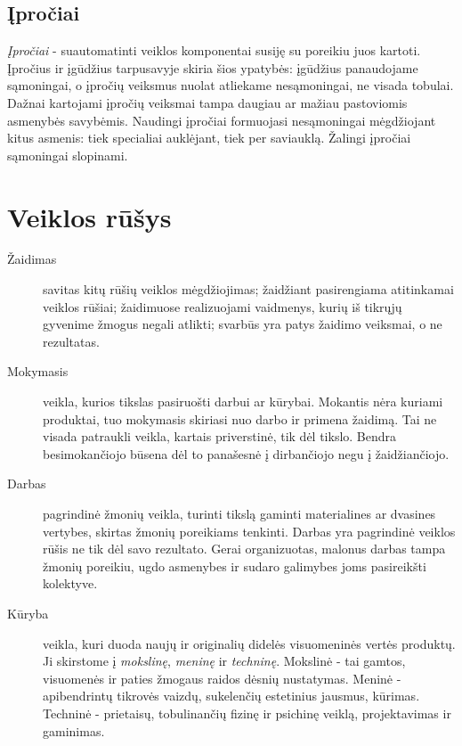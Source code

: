 \subsection{Įpročiai}

\emph{Įpročiai} - suautomatinti veiklos komponentai susiję su poreikiu juos
kartoti. Įpročius ir įgūdžius tarpusavyje skiria šios ypatybės: įgūdžius 
panaudojame sąmoningai, o įpročių veiksmus nuolat atliekame nesąmoningai, ne
visada tobulai. Dažnai kartojami įpročių veiksmai tampa daugiau ar mažiau
pastoviomis asmenybės savybėmis. Naudingi įpročiai formuojasi nesąmoningai
mėgdžiojant kitus asmenis: tiek specialiai auklėjant, tiek per saviauklą.
Žalingi įpročiai sąmoningai slopinami.

\section{Veiklos rūšys}

\label{tema:veiklos_rusys}

\begin{description}
  \item[Žaidimas] savitas kitų rūšių veiklos mėgdžiojimas; žaidžiant 
  pasirengiama atitinkamai veiklos rūšiai; žaidimuose realizuojami vaidmenys,
  kurių iš tikrųjų gyvenime žmogus negali atlikti; svarbūs yra patys 
  žaidimo veiksmai, o ne rezultatas.
  \item[Mokymasis] veikla, kurios tikslas pasiruošti darbui ar kūrybai.
  Mokantis nėra kuriami produktai, tuo mokymasis skiriasi nuo darbo ir 
  primena žaidimą. Tai ne visada patraukli veikla, kartais priverstinė, tik
  dėl tikslo. Bendra besimokančiojo būsena dėl to panašesnė į dirbančiojo
  negu į žaidžiančiojo.
  \item[Darbas] pagrindinė žmonių veikla, turinti tikslą gaminti materialines
  ar dvasines vertybes, skirtas žmonių poreikiams tenkinti. Darbas yra
  pagrindinė veiklos rūšis ne tik dėl savo rezultato. Gerai organizuotas,
  malonus darbas tampa žmonių poreikiu, ugdo asmenybes ir sudaro galimybes
  joms pasireikšti kolektyve.
  \item[Kūryba] veikla, kuri duoda naujų ir originalių didelės visuomeninės 
  vertės produktų. Ji skirstome į \emph{mokslinę}, \emph{meninę} ir 
  \emph{techninę}. Mokslinė - tai gamtos, visuomenės ir paties žmogaus raidos
  dėsnių nustatymas. Meninė - apibendrintų tikrovės vaizdų, sukelenčių
  estetinius jausmus, kūrimas. Techninė - prietaisų, tobulinančių fizinę ir
  psichinę veiklą, projektavimas ir gaminimas.
\end{description}


